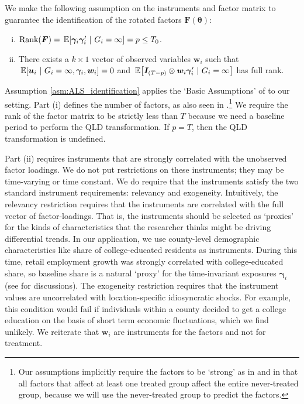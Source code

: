 \documentclass[12pt]{article}
\begin{document}
We make the following assumption on the instruments and factor matrix to guarantee the identification of the rotated factors $\bm F(\bm \theta)$:
\begin{assumption}\label{asm:ALS_identification}\text{ }
  \begin{enumerate}[(i)]
    \item $\text{Rank}(\bm{F}) = \expec{\bm \gamma_i \bm \gamma_i'}{G_i = \infty} = p \leq T_0$.  
    \item There exists a $k \times 1$ vector of observed variables $\bm w_i$ such that $\expec{\bm u_i}{G_i = \infty, \bm \gamma_i, \bm w_i} = 0$ and $\expec{\bm I_{(T - p)} \otimes \bm w_i \bm \gamma_i'}{G_i = \infty}$ has full rank.
  \end{enumerate}
\end{assumption}
Assumption \ref{asm:ALS_identification} applies the `Basic Assumptions' of \citet{Ahn_Lee_Schmidt_2013} to our setting. Part (i) defines the number of factors, as also seen in \citet{Bai_2009}.\footnote{Our assumptions implicitly require the factors to be `strong' as in \citet{Bai_2009} and \citet{Ahn_Lee_Schmidt_2013} in that all factors that affect at least one treated group affect the entire never-treated group, because we will use the never-treated group to predict the factors.} We require the rank of the factor matrix to be strictly less than $T$ because we need a baseline period to perform the QLD transformation. If $p = T$, then the QLD transformation is undefined. 

Part (ii) requires instruments that are strongly correlated with the unobserved factor loadings. 
We do not put restrictions on these instruments; they may be time-varying or time constant. 
We do require that the instruments satisfy the two standard instrument requirements: relevancy and exogeneity. 
Intuitively, the relevancy restriction requires that the instruments are correlated with the full vector of factor-loadings. 
That is, the instruments should be selected as `proxies' for the kinds of characteristics that the researcher thinks might be driving differential trends.
In our application, we use county-level demographic characteristics like share of college-educated residents as instruments. During this time, retail employment growth was strongly correlated with college-educated share, so baseline share is a natural `proxy' for the time-invariant exposures $\bm \gamma_i$ (see \citet{hatch2000job} for discussions). The exogeneity restriction requires that the instrument values are uncorrelated with location-specific idiosyncratic shocks. For example, this condition would fail if individuals within a county decided to get a college education on the basis of short term economic fluctuations, which we find unlikely. We reiterate that $\bm w_i$ are instruments for the factors and not for treatment.
\end{document}
